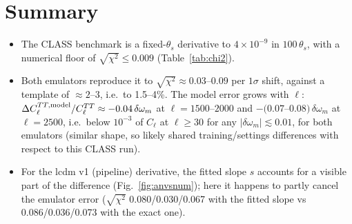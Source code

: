 \documentclass[10pt]{article}
\newcommand{\om}{\omega_m}
\newcommand{\dC}{\partial C_\ell/\partial\om}
\begin{document}
\begin{table}[H]
\centering
\caption{Noise-weighted size of each model error for $\delta\om=\sigma(\om)=0.0012$ (scales linearly with $\delta\om$):
$\sqrt{\chi^2}=\big[\sum_\ell(\Delta\,\dC\,\delta\om)^2/{\rm Var}(C_\ell)\big]^{1/2}$, cosmic variance only,
$f_{\rm sky}=0.57$, $30\le\ell\le2508$. The first row is the size of the template itself.}
\label{tab:chi2}

\end{table}

\begin{table}[H]
\centering
\caption{$TT$: model error $\Delta C_\ell^{\rm model}/(C_\ell^{TT}\,\delta\om)$ in units of $10^{-2}$ (multiply by $\delta\om$ for the fractional change of $C_\ell^{TT}$). ``lcdm v1'' is the pipeline's analytic
derivative (fitted $s$), ``exact $s$'' the same with the exact CLASS slope.}
\label{tab:relTT}

\end{table}

\begin{table}[H]
\centering
\caption{$TE$: model error $\Delta C_\ell^{\rm model}/(\sqrt{C_\ell^{TT}C_\ell^{EE}}\,\delta\om)$ in units of $10^{-2}$. Columns as in Table~\ref{tab:relTT}.}
\label{tab:relTE}

\end{table}

\begin{table}[H]
\centering
\caption{$EE$: model error $\Delta C_\ell^{\rm model}/(C_\ell^{EE}\,\delta\om)$ in units of $10^{-2}$. Columns as in Table~\ref{tab:relTT}.}
\label{tab:relEE}

\end{table}

\section{Summary}
\begin{itemize}
\item The CLASS benchmark is a fixed-$\theta_s$ derivative to $4\times10^{-9}$ in $100\,\theta_s$, with a numerical
  floor of $\sqrt{\chi^2}\le0.009$ (Table~\ref{tab:chi2}).
\item Both emulators reproduce it to $\sqrt{\chi^2}\approx0.03$--$0.09$ per $1\sigma$ shift, against a template of
  $\approx2$--$3$, i.e.\ to 1.5--4\%. The model error grows with $\ell$: $\Delta C_\ell^{TT,\rm model}/C_\ell^{TT}\approx-0.04\,\delta\om$ at
  $\ell=1500$--$2000$ and $-(0.07$--$0.08)\,\delta\om$ at $\ell=2500$, i.e.\ below $10^{-3}$ of $C_\ell$ at $\ell\ge30$ for any
  $|\delta\om|\lesssim0.01$, for both emulators (similar shape, so likely shared
  training/settings differences with respect to this CLASS run).
\item For the lcdm v1 (pipeline) derivative, the fitted slope $s$ accounts for a visible part of the difference
  (Fig.~\ref{fig:anvsnum}); here it happens to partly cancel the emulator error
  ($\sqrt{\chi^2}$ 0.080/0.030/0.067 with the fitted slope vs 0.086/0.036/0.073 with the exact one).
\end{itemize}
\end{document}
